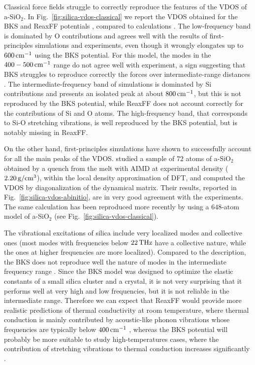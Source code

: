 Classical force fields struggle to correctly reproduce the features of the VDOS of a-SiO$_2$. In Fig.~\ref{fig:silica-vdos-classical} we report the VDOS obtained for the BKS and ReaxFF potentials \cite{Tian2017}, compared to \abinitio calculations \cite{Bhattarai2016}. 
The low-frequency band is dominated by O contributions and agrees well with the results of first-principles simulations and experiments, even though it wrongly elongates up to $600\,\mathrm{cm^{-1}}$ using the BKS potential. For this model, the modes in the $400-500\,\mathrm{cm^{-1}}$ range do not agree well with experiment, a sign suggesting that BKS struggles to reproduce correctly the forces over intermediate-range distances \cite{Vollmayr1996,Benoit2002}. 
The intermediate-frequency band of \abinitio simulations is dominated by Si contributions and presents an isolated peak at about $800\,\mathrm{cm^{-1}}$, but this is not reproduced by the BKS potential, while ReaxFF does not account correctly for the contributions of Si and O atoms. 
The high-frequency band, that corresponds to Si-O stretching vibrations, is well reproduced by the BKS potential, but is notably missing in ReaxFF. 

On the other hand, first-principles simulations have shown to successfully account for all the main peaks of the VDOS. \citet{Sarnthein1997} studied a sample of $72$ atoms of a-SiO$_2$ obtained by a quench from the melt with AIMD at experimental density ($2.20\,\mathrm{g/cm^3}$), within the local density approximation of DFT, and computed the VDOS by diagonalization of the dynamical matrix. Their results, reported in Fig.~\ref{fig:silica-vdos-abinitio}, are in very good agreement with the experiments. The same calculation has been reproduced more recently by \citet{Bhattarai2016} using a $648$-atom model of a-SiO$_2$ (see Fig.~\ref{fig:silica-vdos-classical}). 

The vibrational excitations of silica include very localized modes and collective ones (most modes with frequencies below $22\,\mathrm{THz}$ have a collective nature, while the ones at higher frequencies are more localized). Compared to the \abinitio description, the BKS does not reproduce well the nature of modes in the intermediate frequency range \cite{Benoit2002}. Since the BKS model was designed to optimize the elastic constants of a small silica cluster and a crystal, it is not very surprising that it performs well at very high and low frequencies, but it is not reliable in the intermediate range. 
Therefore we can expect that ReaxFF would provide more realistic predictions of thermal conductivity at room temperature, where thermal conduction is mainly contributed by acoustic-like phonon vibrations whose frequencies are typically below $400\,\mathrm{cm^{-1}}$ \cite{Bhattarai2016}, whereas the BKS potential will probably be more suitable to study high-temperatures cases, where the contribution of stretching vibrations to thermal conduction increases significantly \cite{Tian2017}. 


